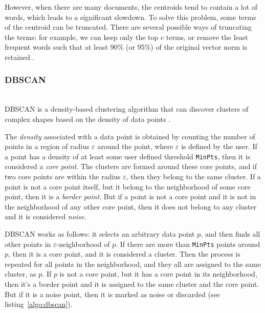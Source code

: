 
However, when there are many documents, the centroids tend
to contain a lot of words, which leads to a significant slowdown.
To solve this problem, some terms of the centroid can be truncated.
There are several possible ways of truncating the terms: for example,
we can keep only the top $c$ terms, or remove the least frequent words
such that at least 90\% (or 95\%) of the original vector norm is
retained \cite{schutze1997projections}.


\subsubsection{DBSCAN} \label{sec:dbscan} \ \\

DBSCAN is a density-based clustering algorithm that can discover
clusters of complex shapes based on the density of data points \cite{ester1996density}.

The \emph{density} associated with a data point is obtained by
counting the number of points in a region of radius $\varepsilon$
around the point, where $\varepsilon$  is defined by the user.
If a point has a density of at least some user defined
threshold \verb|MinPts|, then it is considered a \emph{core point}.
The clusters are formed around these core points, and if two core points
are within the radius $\varepsilon$, then they belong to the same cluster.
If a point is not a core point itself, but it belong to the neighborhood of some
core point, then it is a \emph{border point}. But if a point is not a core point
and it is not in the neighborhood of any other core point, then it does not
belong to any cluster and it is considered \emph{noise}.

DBSCAN works as follows: it selects an arbitrary data point $p$, and then
finds all other points in $\varepsilon$-neighborhood of $p$. If
there are more than  \verb|MinPts| points around $p$, then it is a core point,
and it is considered a cluster. Then the process is repeated for all points in
the neighborhood, and they all are assigned to the same cluster, as $p$.
If $p$ is not a core point, but it has a core point in its neighborhood, then
it's a border point and it is assigned to the same cluster and the core point.
But if it is a noise point, then it is marked as noise or discarded
(see listing~\ref{algo:dbscan}).


